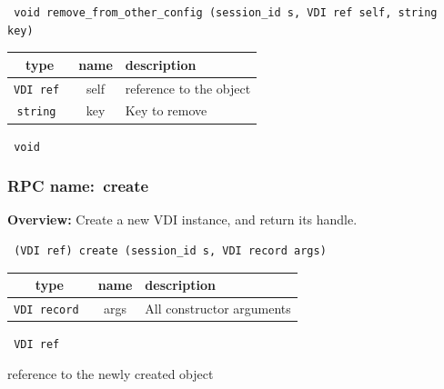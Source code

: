 \begin{verbatim} void remove_from_other_config (session_id s, VDI ref self, string key)\end{verbatim}



 
\vspace{0.3cm}
\begin{tabular}{|c|c|p{7cm}|}
 \hline
{\bf type} & {\bf name} & {\bf description} \\ \hline
{\tt VDI ref } & self & reference to the object \\ \hline 

{\tt string } & key & Key to remove \\ \hline 

\end{tabular}

\vspace{0.3cm}

{\tt 
void
}



\vspace{0.3cm}
\vspace{0.3cm}
\vspace{0.3cm}
\subsubsection{RPC name:~create}

{\bf Overview:} 
Create a new VDI instance, and return its handle.

\begin{verbatim} (VDI ref) create (session_id s, VDI record args)\end{verbatim}



 
\vspace{0.3cm}
\begin{tabular}{|c|c|p{7cm}|}
 \hline
{\bf type} & {\bf name} & {\bf description} \\ \hline
{\tt VDI record } & args & All constructor arguments \\ \hline 

\end{tabular}

\vspace{0.3cm}

{\tt 
VDI ref
}


reference to the newly created object
\vspace{0.3cm}
\vspace{0.3cm}
\vspace{0.3cm}
